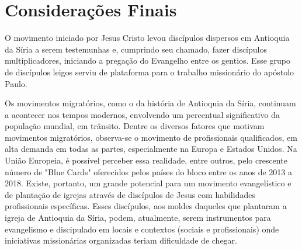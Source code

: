 \documentclass[12pt,openright,oneside,a4paper]{abntex2}
\begin{document}
\chapter*{Considerações Finais}
O movimento iniciado por Jesus Cristo levou discípulos dispersos em Antioquia da Síria a serem testemunhas e, cumprindo seu chamado, fazer discípulos multiplicadores, iniciando a pregação do Evangelho entre os gentios. Esse grupo de discípulos leigos serviu de plataforma para o trabalho missionário do apóstolo Paulo. 

Os movimentos migratórios, como o da história de Antioquia da Síria, continuam a acontecer nos tempos modernos, envolvendo um percentual significativo da população mundial, em trânsito. Dentre os diversos fatores que motivam movimentos migratórios, observa-se o movimento de profissionais qualificados, em alta demanda em todas as partes, especialmente na Europa e Estados Unidos. Na União Europeia, é possível perceber essa realidade, entre outros, pelo crescente número de "Blue Cards" oferecidos pelos países do bloco entre os anos de 2013 a 2018. Existe, portanto, um grande potencial para um movimento evangelístico e de plantação de igrejas através de discípulos de Jesus com habilidades profissionais específicas. Esses discípulos, aos moldes daqueles que plantaram a igreja de Antioquia da Síria, podem, atualmente, serem instrumentos para evangelismo e discipulado em locais e contextos (sociais e profissionais) onde iniciativas missionárias organizadas teriam dificuldade de chegar.
\end{document}
